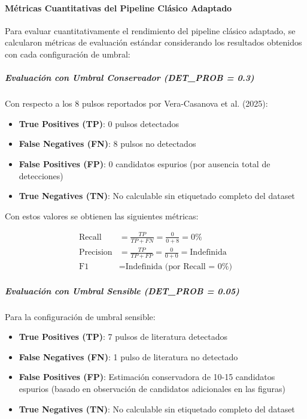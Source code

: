 \paragraph{Métricas Cuantitativas del Pipeline Clásico Adaptado}

Para evaluar cuantitativamente el rendimiento del pipeline clásico adaptado, se calcularon métricas de evaluación estándar considerando los resultados obtenidos con cada configuración de umbral:

\subparagraph{Evaluación con Umbral Conservador (DET\_PROB = 0.3)}

Con respecto a los 8 pulsos reportados por Vera-Casanova et al. (2025):

\begin{itemize}
    \item \textbf{True Positives (TP)}: 0 pulsos detectados
    \item \textbf{False Negatives (FN)}: 8 pulsos no detectados
    \item \textbf{False Positives (FP)}: 0 candidatos espurios (por ausencia total de detecciones)
    \item \textbf{True Negatives (TN)}: No calculable sin etiquetado completo del dataset
\end{itemize}

Con estos valores se obtienen las siguientes métricas:

\begin{align}
\text{Recall} &= \frac{TP}{TP + FN} = \frac{0}{0 + 8} = 0\% \\
\text{Precision} &= \frac{TP}{TP + FP} = \frac{0}{0 + 0} = \text{Indefinida} \\
\text{F1} &= \text{Indefinida (por Recall = 0\%)}
\end{align}

\subparagraph{Evaluación con Umbral Sensible (DET\_PROB = 0.05)}

Para la configuración de umbral sensible:

\begin{itemize}
    \item \textbf{True Positives (TP)}: 7 pulsos de literatura detectados
    \item \textbf{False Negatives (FN)}: 1 pulso de literatura no detectado
    \item \textbf{False Positives (FP)}: Estimación conservadora de 10-15 candidatos espurios (basado en observación de candidatos adicionales en las figuras)
    \item \textbf{True Negatives (TN)}: No calculable sin etiquetado completo del dataset
\end{itemize}


